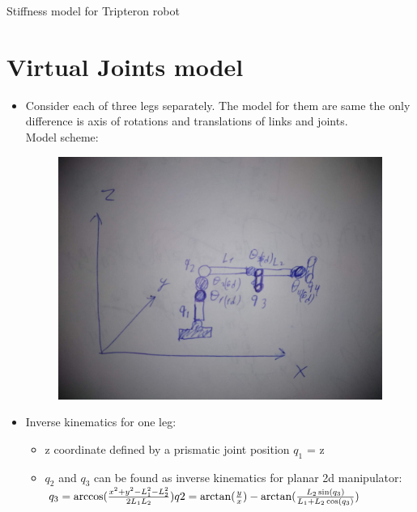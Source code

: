 \documentclass[12pt]{article}
\begin{document}
	\begin{center}
		\LARGE{Stiffness model for Tripteron robot}
	\end{center}
	\section{Virtual Joints model}
	\begin{itemize}
		\item Consider each of three legs separately. The model for them are same the only difference is axis of rotations and translations of links and joints.\\
		Model scheme:
		\begin{figure}[H]
			\includegraphics[scale=0.1]{scheme.jpg}
		\end{figure}
		
		\item Inverse kinematics for one leg:
		\begin{itemize}
			\item z coordinate defined by a prismatic joint position $q_1$ = z
			\item $q_2$ and $q_3$ can be found as inverse kinematics for planar 2d manipulator: \\
			\begin{math}
				q_3 = \arccos(\frac{x^2 + y^2 - L_1^2 - L_2^2}{2 L_1 L_2}) \\
				q2 = \arctan(\frac{y}{x}) - \arctan(\frac{L_2 \sin(q_3)}{L_1 + L_2 \cos(q_3)})
			\end{math}
		\end{itemize}
		

\end{itemize}
\end{document}
